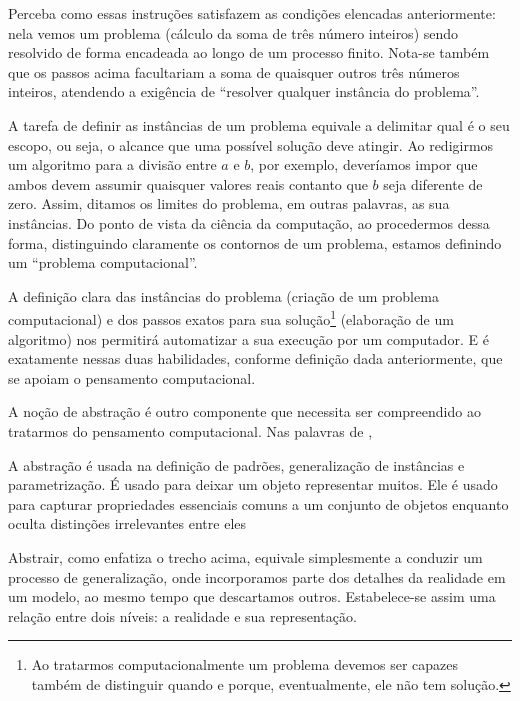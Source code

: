 Perceba como essas instruções satisfazem as condições elencadas anteriormente: nela vemos um problema (cálculo da soma de três número inteiros) sendo resolvido de forma encadeada ao longo de um processo finito. Nota-se também que os passos acima facultariam a soma de quaisquer outros três números inteiros, atendendo a exigência de ``resolver qualquer instância do problema''. 

A tarefa de definir as instâncias de um problema equivale a delimitar qual é o seu escopo, ou seja, o alcance que uma possível solução deve atingir. Ao redigirmos um algoritmo para a divisão entre $a$ e $b$, por exemplo, deveríamos impor que ambos devem assumir quaisquer valores reais contanto que $b$ seja diferente de zero. Assim, ditamos os limites do problema, em outras palavras, as sua instâncias. Do ponto de vista da ciência da computação, ao procedermos dessa forma, distinguindo claramente os contornos de um problema, estamos definindo um ``problema computacional''.

A definição clara das instâncias do problema (criação de um problema computacional) e dos passos exatos para sua solução\footnote{Ao tratarmos computacionalmente um problema devemos ser capazes também de distinguir quando e porque, eventualmente, ele não tem solução.} (elaboração de um algoritmo) nos permitirá automatizar a sua execução por um computador. E é exatamente nessas duas habilidades, conforme definição dada anteriormente, que se apoiam o pensamento computacional.

A noção de abstração é outro componente que necessita ser compreendido ao tratarmos do pensamento computacional. Nas palavras de ,

\begin{citacao}
A abstração é usada na definição de padrões, generalização de instâncias e parametrização. É usado para deixar um objeto representar muitos. Ele é usado para capturar propriedades essenciais comuns a um conjunto de objetos enquanto oculta distinções irrelevantes entre eles \cite[p.~1. Tradução nossa]{wing2006}
\end{citacao}

Abstrair, como enfatiza o trecho acima, equivale simplesmente a conduzir um processo de generalização, onde incorporamos parte dos detalhes da realidade em um modelo, ao mesmo tempo que descartamos outros. Estabelece-se assim uma relação entre dois níveis: a realidade e sua representação.

